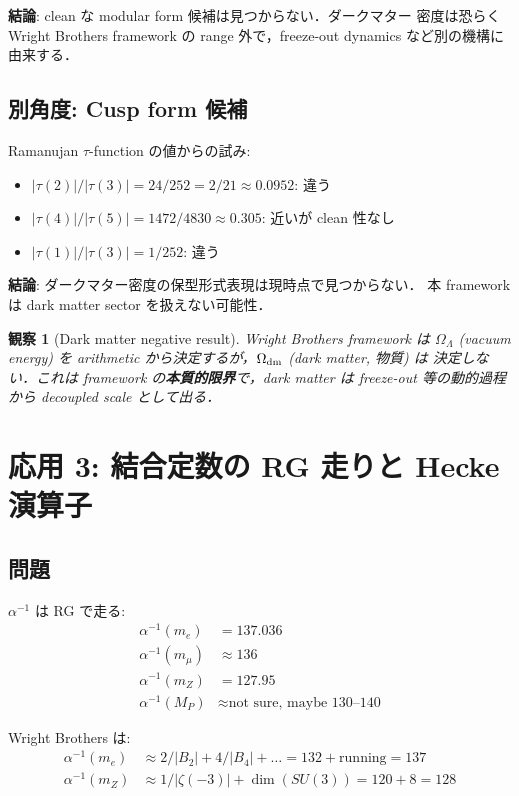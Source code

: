 \documentclass[11pt,a4paper]{article}
\newtheorem{observation}{観察}
\begin{document}
\textbf{結論}: clean な modular form 候補は見つからない．ダークマター
密度は恐らく Wright Brothers framework の range 外で，freeze-out
dynamics など別の機構に由来する．

\subsection{別角度: Cusp form 候補}

Ramanujan $\tau$-function の値からの試み:
\begin{itemize}
\item $|\tau(2)|/|\tau(3)| = 24/252 = 2/21 \approx 0.0952$: 違う
\item $|\tau(4)|/|\tau(5)| = 1472/4830 \approx 0.305$: 近いが clean 性なし
\item $|\tau(1)|/|\tau(3)| = 1/252$: 違う
\end{itemize}

\textbf{結論}: ダークマター密度の保型形式表現は現時点で見つからない．
本 framework は dark matter sector を扱えない可能性．

\begin{observation}[Dark matter negative result]
Wright Brothers framework は $\Omega_\Lambda$ (vacuum energy) を
arithmetic から決定するが，$\Omega_{\rm dm}$ (dark matter, 物質) は
決定しない．これは framework の\textbf{本質的限界}で，dark matter は
freeze-out 等の動的過程から decoupled scale として出る．
\end{observation}

\section{応用 3: 結合定数の RG 走りと Hecke 演算子}

\subsection{問題}

$\alpha^{-1}$ は RG で走る:
\begin{align}
\alpha^{-1}(m_e) &= 137.036\\
\alpha^{-1}(m_\mu) &\approx 136\\
\alpha^{-1}(m_Z) &= 127.95\\
\alpha^{-1}(M_P) &\approx \text{not sure, maybe 130--140}
\end{align}

Wright Brothers は:
\begin{align}
\alpha^{-1}(m_e) &\approx 2/|B_2| + 4/|B_4| + \ldots = 132 + \text{running} = 137\\
\alpha^{-1}(m_Z) &\approx 1/|\zeta(-3)| + \dim(SU(3)) = 120 + 8 = 128
\end{align}
\end{document}
